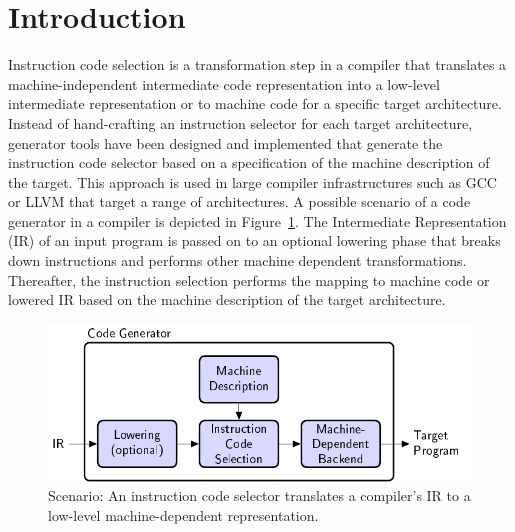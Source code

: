 \section{Introduction}

Instruction code selection is a transformation step in a compiler that
translates a machine-independent intermediate code representation into
a low-level intermediate representation or to machine code for a
specific target architecture. Instead of hand-crafting an instruction
selector for each target architecture, generator tools have been
designed and implemented that generate the instruction code selector based
on a specification of the machine description of the
target. This approach is used in large compiler infrastructures such
as GCC or LLVM that target a range of architectures.  A possible
scenario of a code generator in a compiler is depicted in
Figure~\ref{fig:instruction-selection}. The Intermediate
Representation (IR) of an input program is passed on to an optional
lowering phase that breaks down instructions and performs other
machine dependent transformations. Thereafter, the instruction
selection performs the mapping to machine code or lowered IR based on
the machine description of the target architecture.


\begin{figure}[t]
  \begin{center}
    \includegraphics[width=\linewidth]{pgf-fig001}
  \end{center}
  \caption{Scenario: An instruction code selector translates a compiler's IR to a
    low-level machine-dependent representation.}
  \label{fig:instruction-selection}
\end{figure}

